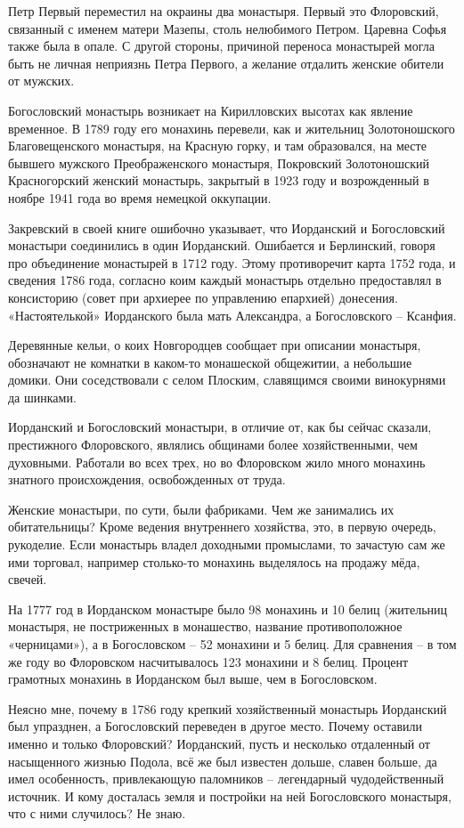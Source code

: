 Петр Первый переместил на окраины два монастыря. Первый это Флоровский, связанный с именем матери Мазепы, столь нелюбимого Петром. Царевна Софья также была в опале. С другой стороны, причиной переноса монастырей могла быть не личная неприязнь Петра Первого, а желание отдалить женские обители от мужских.

Богословский монастырь возникает на Кирилловских высотах как явление временное. В 1789 году его монахинь перевели, как и жительниц Золотоношского Благовещенского монастыря, на  Красную горку, и там образовался, на месте бывшего мужского Преображенского монастыря, Покровский Золотоношский Красногорский женский монастырь, закрытый в 1923 году и возрожденный в ноябре 1941 года во время немецкой оккупации. 

Закревский в своей книге ошибочно указывает, что Иорданский и Богословский монастыри соединились в один Иорданский. Ошибается и Берлинский, говоря про объединение монастырей в 1712 году. Этому противоречит карта 1752 года, и сведения 1786 года, согласно коим каждый монастырь отдельно предоставлял в консисторию (совет при архиерее по управлению епархией) донесения. «Настоятелькой» Иорданского была мать Александра, а Богословского – Ксанфия.

Деревянные кельи, о коих Новгородцев сообщает при описании монастыря, обозначают не комнатки в каком-то монашеской общежитии, а небольшие домики. Они соседствовали с селом Плоским, славящимся своими винокурнями да шинками.

Иорданский и Богословский монастыри, в отличие от, как бы сейчас сказали, престижного Флоровского, являлись общинами более хозяйственными, чем духовными. Работали во всех трех, но во Флоровском жило много монахинь знатного происхождения, освобожденных от труда. 

Женские монастыри, по сути, были фабриками. Чем же занимались их обитательницы? Кроме ведения внутреннего хозяйства, это, в первую очередь, рукоделие. Если монастырь владел доходными промыслами, то зачастую сам же ими торговал, например столько-то монахинь выделялось на продажу мёда, свечей. 

На 1777 год в Иорданском монастыре было 98 монахинь и 10 белиц (жительниц монастыря, не постриженных в монашество, название противоположное «черницами»), а в Богословском – 52 монахини и 5 белиц. Для сравнения – в том же году во Флоровском насчитывалось 123 монахини и 8 белиц. Процент грамотных монахинь в Иорданском был выше, чем в Богословском.

Неясно мне, почему в 1786 году крепкий хозяйственный монастырь Иорданский был упразднен, а Богословский переведен в другое место. Почему оставили именно и только Флоровский? Иорданский, пусть и несколько отдаленный от насыщенного жизнью Подола, всё же был известен дольше, славен больше, да имел особенность, привлекающую паломников – легендарный чудодейственный источник. И кому досталась земля и постройки на ней Богословского монастыря, что с ними случилось? Не знаю.

